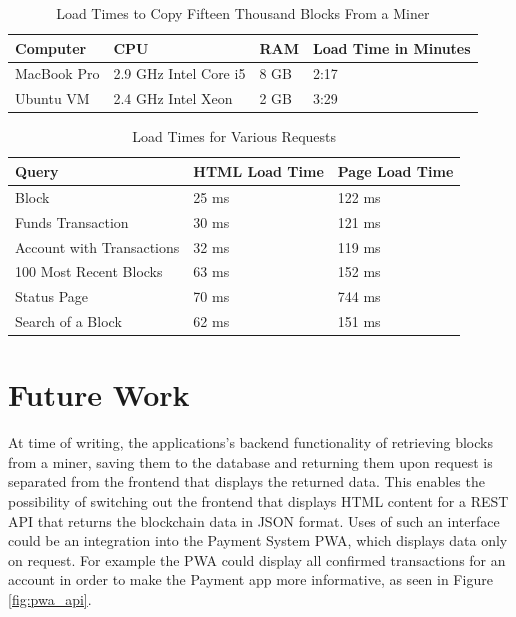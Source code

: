 \begin{table}[]
\centering
\caption{Load Times to Copy Fifteen Thousand Blocks From a Miner}
\label{tab:load}
\begin{tabular}{|l|l|l|l|}
\hline
\textbf{Computer} & \textbf{CPU} & \textbf{RAM} & \textbf{Load Time in Minutes} \\ \hline
MacBook Pro & 2.9 GHz Intel Core i5 & 8 GB & 2:17 \\ \hline
Ubuntu VM & 2.4 GHz  Intel Xeon & 2 GB  & 3:29 \\ \hline
\end{tabular}
\end{table}

\begin{table}[]
\centering
\caption{Load Times for Various Requests}
\label{tab:query}
\begin{tabular}{|l|l|l|}
\hline
\textbf{Query}            & \textbf{HTML Load Time} & \textbf{Page Load Time} \\ \hline
Block                     & 25 ms                   & 122 ms                  \\ \hline
Funds Transaction         & 30 ms                   & 121 ms                  \\ \hline
Account with Transactions & 32 ms                   & 119 ms                  \\ \hline
100 Most Recent Blocks    & 63 ms                   & 152 ms                  \\ \hline
Status Page               & 70 ms                   & 744 ms                  \\ \hline
Search of a Block         & 62 ms                   & 151 ms                  \\ \hline
\end{tabular}
\end{table}

\section{Future Work}
At time of writing, the applications's backend functionality of retrieving blocks from a miner, saving them to the database and returning them upon request is separated from the frontend that displays the returned data. This enables the possibility of switching out the frontend that displays HTML content for a REST API that returns the blockchain data in JSON format. Uses of such an interface could be an integration into the Payment System PWA, which displays data only on request. For example the PWA could display all confirmed transactions for an account in order to make the Payment app more informative, as seen in Figure \ref{fig:pwa_api}.


